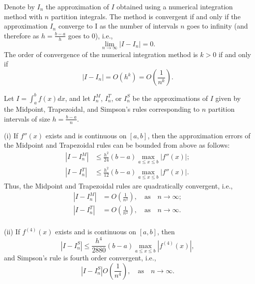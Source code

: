 \begin{definition}
    Denote by $ I_n $ the approximation of $ I $ obtained using a numerical
        integration method with $ n $ partition integrals.
    The method is convergent if and only if the approximation $ I_n $ converge
        to I as the number of intervals $ n $ goes to infinity (and therefore
        as $ h = \frac{b - a}{h} $ goes to 0), i.e.,
    \begin{equation*}
        \lim_{n \rightarrow \infty} | I - I_n | = 0.
    \end{equation*}
    The order of convergence of the numerical integration method is $ k > 0 $
        if and only if
    \begin{equation*}
        | I - I_n | = O(h^k) = O \left( \frac{1}{n^k} \right).
    \end{equation*}
\end{definition}

\begin{theorem}
    Let $ I = \int_{a}^{b} f(x) dx $, and let $ I_n^M $, $ I_n^T $, or
        $ I_n^S $ be the approximations of $ I $ given by the Midpoint,
        Trapezoidal, and Simpson's rules corresponding to $ n $ partition
        intervals of size $ h = \frac{b - a}{n} $.

    (i) If $ f''(x) $ exists and is continuous on $ [a, b] $, then the
        approximation errors of the Midpoint and Trapezoidal rules can be
        bounded from above as follows:
    \begin{align}
        | I - I_n^M | &\leq \frac{h^2}{24} (b - a)
            \max_{a \leq x \leq b} | f''(x) |;
            \label{eq:midpoint-rule-upper-bound} \\
        | I - I_n^T | &\leq \frac{h^2}{12} (b - a)
            \max_{a \leq x \leq b} | f''(x) |.
            \label{eq:trapezoidal-rule-upper-bound}
    \end{align}
    Thus, the Midpoint and Trapezoidal rules are quadratically convergent, i.e.,
    \begin{align}
        | I - I_n^M | &= O \left( \frac{1}{n^2} \right), \quad
            \text{as}\quad n \rightarrow \infty; \\
        | I - I_n^T | &= O \left( \frac{1}{n^2} \right), \quad
            \text{as}\quad n \rightarrow \infty. \\
    \end{align}

    (ii) If $ f^{(4)}(x) $ exists and is continuous on $ [a, b] $, then
    \begin{equation}
        | I - I_n^S | \leq \frac{h^4}{2880} (b - a)
            \max_{a \leq x \leq b} | f^{(4)}(x) |,
        \label{eq:simpsons-rule-upper-bound}
    \end{equation}
    and Simpson's rule is fourth order convergent, i.e.,
    \begin{equation}
        | I - I_n^S |  O \left( \frac{1}{n^4} \right), \quad
            \text{as}\quad n \rightarrow \infty.
    \end{equation}
\end{theorem}

